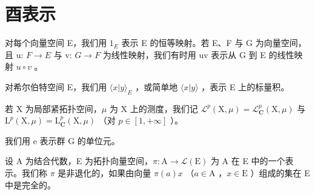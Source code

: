 \chapter{酉表示}
\setcounter{exercisepar}{0}

对每个向量空间 E，我们用 \(1_{E}\) 表示 E 的恒等映射。若 E、F 与 G 为向量空间，且 u: \(F \rightarrow E\) 与 v: \(G \rightarrow F\) 为线性映射，我们有时用 uv 表示从 G 到 E 的线性映射 \(u \circ v\) 。

对希尔伯特空间 E，我们用 \(\langle x | y \rangle_{E}\) ，或简单地 \(\langle x | y \rangle\) ，表示 E 上的标量积。

若 X 为局部紧拓扑空间，\(\mu\) 为 X 上的测度，我们记 \(\mathcal{L}^{p}(\mathrm{X},\mu)=\mathcal{L}_{\mathbf{C}}^{p}(\mathrm{X},\mu)\) 与 \(\mathrm{L}^{p}(\mathrm{X},\mu)=\mathrm{L}_{\mathbf{C}}^{p}(\mathrm{X},\mu)\) （对 \(p\in[1,+\infty]\) ）。

我们用 e 表示群 G 的单位元。

设 A 为结合代数，E 为拓扑向量空间，\(\pi\colon\mathrm{A}\to\mathcal{L}(\mathrm{E})\) 为 A 在 E 中的一个表示。我们称 \(\pi\) 是非退化的，如果由向量 \(\pi(a)x\) （\(a\in\mathrm{A}\) ，\(x\in\mathrm{E}\) ）组成的集在 E 中是完全的。

